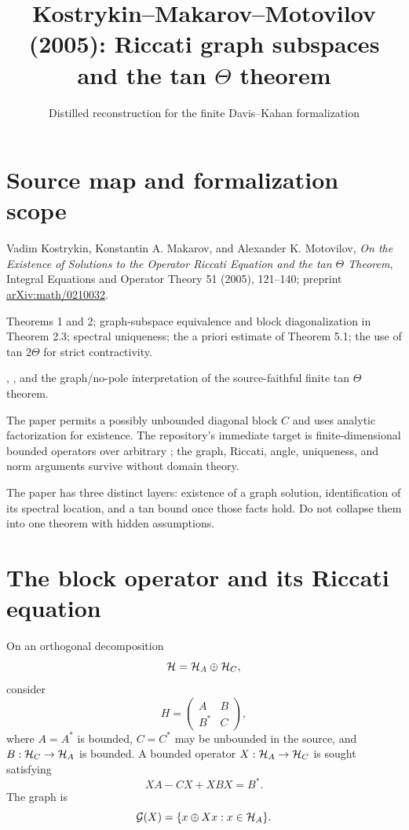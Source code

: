 
\title{Kostrykin--Makarov--Motovilov (2005): Riccati graph subspaces and the tan $\Theta$ theorem}
\author{}
\date{Distilled reconstruction for the finite Davis--Kahan formalization}

\maketitle

\section*{Source map and formalization scope}
\begin{sourceguide}
\item[Primary source] Vadim Kostrykin, Konstantin A. Makarov, and Alexander K. Motovilov, \emph{On the Existence of Solutions to the Operator Riccati Equation and the tan $\Theta$ Theorem}, Integral Equations and Operator Theory 51 (2005), 121--140; preprint \href{https://arxiv.org/abs/math/0210032}{arXiv:math/0210032}.
\item[Coverage] Theorems 1 and 2; graph-subspace equivalence and block diagonalization in Theorem 2.3; spectral uniqueness; the a priori estimate of Theorem 5.1; the use of tan $2\Theta$ for strict contractivity.
\item[Formalization target] , , and the graph/no-pole interpretation of the source-faithful finite tan $\Theta$ theorem.
\item[Scope boundary] The paper permits a possibly unbounded diagonal block $C$ and uses analytic factorization for existence. The repository's immediate target is finite-dimensional bounded operators over arbitrary ; the graph, Riccati, angle, uniqueness, and norm arguments survive without domain theory.
\item[Logical separation] The paper has three distinct layers: existence of a graph solution, identification of its spectral location, and a tan bound once those facts hold. Do not collapse them into one theorem with hidden assumptions.
\end{sourceguide}

\section{The block operator and its Riccati equation}

On an orthogonal decomposition
\[
 \mathcal{H}=\mathcal{H}_A\oplus\mathcal{H}_C,
\]
consider
\[
 H=
 \begin{pmatrix}
 A&B\\
 B^*&C
 \end{pmatrix},
\]
where $A=A^*$ is bounded, $C=C^*$ may be unbounded in the source, and $B:\mathcal{H}_C\to\mathcal{H}_A$ is bounded. A bounded operator $X:\mathcal{H}_A\to\mathcal{H}_C$ is sought satisfying
\begin{equation}
 XA-CX+XBX=B^*.
 \tag{KMM-R}\label{KMM-R}
\end{equation}
The graph is
\[
 \mathcal G(X)=\{x\oplus Xx:x\in\mathcal{H}_A\}.
\]

